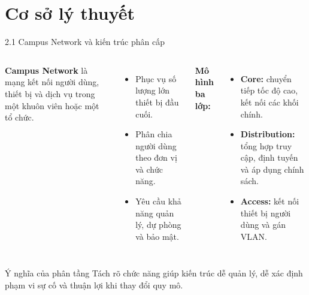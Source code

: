 
\section{Cơ sở lý thuyết}

\begin{frame}{2.1 Campus Network và kiến trúc phân cấp}
    \begin{columns}[T]
        \textbf{Campus Network} là mạng kết nối người dùng, thiết bị và dịch vụ trong một khuôn viên hoặc một tổ chức.
        \vspace{0.2cm}
        \begin{itemize}
            \item Phục vụ số lượng lớn thiết bị đầu cuối.
            \item Phân chia người dùng theo đơn vị và chức năng.
            \item Yêu cầu khả năng quản lý, dự phòng và bảo mật.
        \end{itemize}

        \textbf{Mô hình ba lớp:}
        \begin{itemize}
            \item \textbf{Core:} chuyển tiếp tốc độ cao, kết nối các khối chính.
            \item \textbf{Distribution:} tổng hợp truy cập, định tuyến và áp dụng chính sách.
            \item \textbf{Access:} kết nối thiết bị người dùng và gán VLAN.
        \end{itemize}
    \end{columns}
    \vspace{0.15cm}
    \begin{block}{Ý nghĩa của phân tầng}
        Tách rõ chức năng giúp kiến trúc dễ quản lý, dễ xác định phạm vi sự cố và thuận lợi khi thay đổi quy mô.
    \end{block}
\end{frame}


